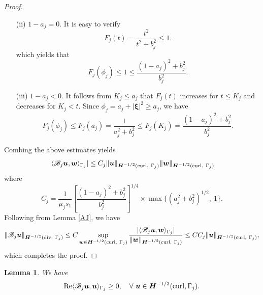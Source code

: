 \documentclass[11pt,reqno]{amsart}
\newtheorem{lemm}[theo]{Lemma}
\numberwithin{equation}{section}
\begin{document}
\begin{proof}
\begin{itemize}
\item[(ii)] $1-a_j=0$. It is easy to verify 
\[
F_j (t)=\frac{t^2}{t^2+b_j^2} \leq 1.
\]
which yields that 
\[
F_j(\phi_j) \leq 1 \leq \frac{(1-a_j)^2+b_j^2}{b_j^2}.
\]

\item[(iii)] $1-a_j <0$. It follows from $K_j \leq a_j$ that $F_j(t)$ increases
for $t \leq K_j$ and decreases for  $ K_j < t$. Since $\phi_j =a_j
+|\boldsymbol \xi|^2 \geq a_j$, we have 
\[
F_j(\phi_j) \leq F_j(a_j)=\frac{1}{a_j^2 +b_j^2} \leq
F_j(K_j)=\frac{(1-a_j)^2+b_j^2}{b_j^2}.
\]
\end{itemize}
Combing the above estimates yields
\[
|\langle \mathscr B_j \boldsymbol u,  \boldsymbol w\rangle_{\Gamma_j}| \leq C_j
\|\boldsymbol u\|_{\boldsymbol H^{-1/2} ({\rm curl},~ \Gamma_j)} \|\boldsymbol
w\|_{\boldsymbol H^{-1/2} ({\rm curl},~ \Gamma_j)}
\]
where
\[
C_j= \frac{1}{\mu_j s_1}\left[\frac{(1-a_j)^2+b_j^2}{b_j^2}\right]^{1/4}\times
\max \{(a_j^2 +b_j^2)^{1/2}, ~ 1\}.
\]
Following from Lemma \ref{AJ}, we have
\[
\|\mathscr B_j \boldsymbol u\|_{\boldsymbol H^{-1/2} ({\rm div},~ \Gamma_j)}
\leq C \sup \limits_{\boldsymbol w \in \boldsymbol H^{-1/2}({\rm curl},~
\Gamma_j)}\frac{|\langle \mathscr B_j \boldsymbol u,  \boldsymbol
w\rangle_{\Gamma_j}|}{\|\boldsymbol w\|_{\boldsymbol H^{-1/2}({\rm curl},~
\Gamma_j)}} \leq C C_j \|\boldsymbol u\|_{\boldsymbol H^{-1/2}({\rm curl},~
\Gamma_j)},
\]
which completes the proof. 
\end{proof}

\begin{lemm}\label{TP}
We have 
\[
{\rm Re} \langle \mathscr B_j \boldsymbol u, \boldsymbol u \rangle_{\Gamma_j}
\geq 0, \quad \forall ~\boldsymbol u \in \boldsymbol H^{-1/2 }({\rm curl},
\Gamma_j).
\]
\end{lemm}
\end{document}
